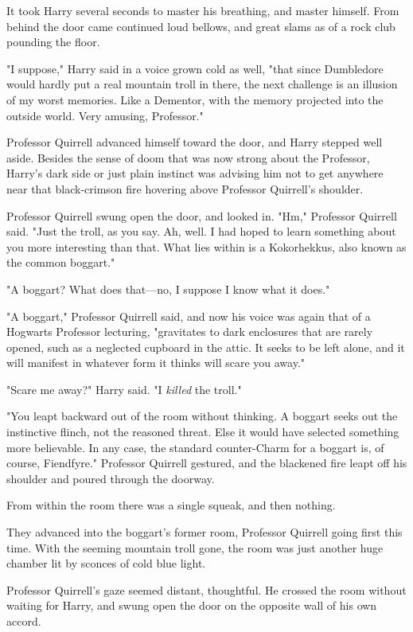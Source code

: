 It took Harry several seconds to master his breathing, and master himself. From 
behind the door came continued loud bellows, and great slams as of a rock club 
pounding the floor.

"I suppose," Harry said in a voice grown cold as well, "that since Dumbledore 
would hardly put a real mountain troll in there, the next challenge is an 
illusion of my worst memories. Like a Dementor, with the memory projected into 
the outside world. Very amusing, Professor."

Professor Quirrell advanced himself toward the door, and Harry stepped well 
aside. Besides the sense of doom that was now strong about the Professor, 
Harry's dark side or just plain instinct was advising him not to get anywhere 
near that black-crimson fire hovering above Professor Quirrell's shoulder.

Professor Quirrell swung open the door, and looked in. "Hm," Professor Quirrell 
said. "Just the troll, as you say. Ah, well. I had hoped to learn something 
about you more interesting than that. What lies within is a Kokorhekkus, 
also known as the common boggart."

"A boggart? What does that---no, I suppose I know what it does."

"A boggart," Professor Quirrell said, and now his voice was again that of a 
Hogwarts Professor lecturing, "gravitates to dark enclosures that are rarely 
opened, such as a neglected cupboard in the attic. It seeks to be left alone, 
and it will manifest in whatever form it thinks will scare you away."

"Scare me away?" Harry said. "I \emph{killed} the troll."

"You leapt backward out of the room without thinking. A boggart seeks out the 
instinctive flinch, not the reasoned threat. Else it would have selected 
something more believable. In any case, the standard counter-Charm for a 
boggart is, of course, Fiendfyre." Professor Quirrell gestured, and the 
blackened fire leapt off his shoulder and poured through the doorway.

From within the room there was a single squeak, and then nothing.

They advanced into the boggart's former room, Professor Quirrell going first 
this time. With the seeming mountain troll gone, the room was just another huge 
chamber lit by sconces of cold blue light.

Professor Quirrell's gaze seemed distant, thoughtful. He crossed the room 
without waiting for Harry, and swung open the door on the opposite wall of his 
own accord.

